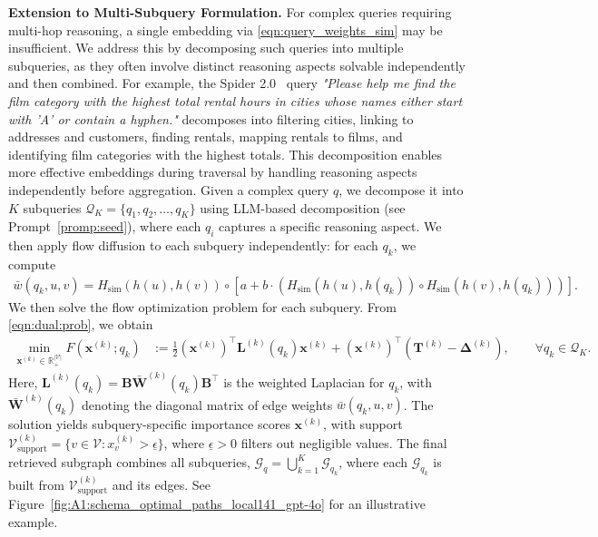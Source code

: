 \documentclass{article} %
\begin{document}
\noindent \textbf{Extension to Multi-Subquery Formulation. }
For complex queries requiring multi-hop reasoning, a single embedding via \eqref{eqn:query_weights_sim} may be insufficient. We address this by decomposing such queries into multiple subqueries, as they often involve distinct reasoning aspects solvable independently and then combined. For example, the Spider 2.0~\citep{lei2024spider} query \textit{"Please help me find the film category with the highest total rental hours in cities whose names either start with 'A' or contain a hyphen."} decomposes into filtering cities, linking to addresses and customers, finding rentals, mapping rentals to films, and identifying film categories with the highest totals. This decomposition enables more effective embeddings during traversal by handling reasoning aspects independently before aggregation. Given a complex query $q$, we decompose it into $K$ subqueries $\mathcal{Q}_K=\{q_1, q_2, \ldots, q_K\}$ using LLM-based decomposition (see Prompt~\ref{promp:seed}), where each $q_i$ captures a specific reasoning aspect. We then apply flow diffusion to each subquery independently: for each $q_k$, we compute
\begin{align}
\label{eqn:subquery_weights}
\bar{w}(q_k, u, v) = H_{\text{sim}}(h(u), h(v)) \circ \left[a + b \cdot \left(H_{\text{sim}}(h(u), h(q_k)) \circ H_{\text{sim}}(h(v), h(q_k))\right)\right].
\end{align}
We then solve the flow optimization problem for each subquery. From \eqref{eqn:dual:prob}, we obtain
\begin{align}\label{eqn:subquery_dual_optimization}
\min_{\mathbf{x}^{(k)} \in \mathbb{R}_+^{|\mathcal{V}|}} F(\mathbf{x}^{(k)}; q_k) &:= \tfrac{1}{2} (\mathbf{x}^{(k)})^\top \mathbf{L}^{(k)}(q_k) \mathbf{x}^{(k)} + (\mathbf{x}^{(k)})^\top (\mathbf{T}^{(k)} - \boldsymbol{\Delta}^{(k)}), \qquad \forall  q_k \in \mathcal{Q}_K.
\end{align}
Here, $\mathbf{L}^{(k)}(q_k) = \mathbf{B} \bar{\mathbf{W}}^{(k)}(q_k) \mathbf{B}^\top$ is the weighted Laplacian for $q_k$, with $\bar{\mathbf{W}}^{(k)}(q_k)$ denoting the diagonal matrix of edge weights $\bar{w}(q_k, u, v)$. The solution yields subquery-specific importance scores $\mathbf{x}^{(k)}$, with support $\mathcal{V}_{\text{support}}^{(k)} = \{v \in \mathcal{V} : x_v^{(k)} > \underline{\epsilon}\}$, where $\underline{\epsilon} > 0$ filters out negligible values. The final retrieved subgraph combines all subqueries, $\mathcal{G}_q = \bigcup_{k=1}^K \mathcal{G}_{q_k}$, where each $\mathcal{G}_{q_k}$ is built from $\mathcal{V}_{\text{support}}^{(k)}$ and its edges. See Figure~\ref{fig:A1:schema_optimal_paths_local141_gpt-4o} for an illustrative example.
\end{document}

